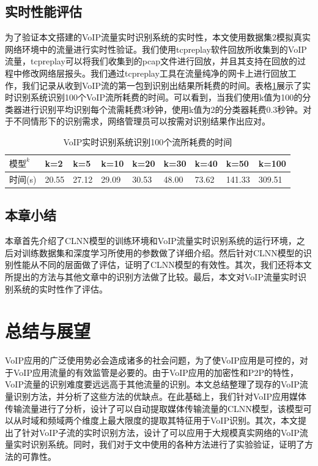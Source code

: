 \section{实时性能评估}
为了验证本文搭建的VoIP流量实时识别系统的实时性，本文使用数据集2模拟真实网络环境中的流量进行实时性验证。我们使用tcpreplay软件回放所收集到的VoIP流量，tcpreplay可以将我们收集到的pcap文件进行回放，并且其支持在回放的过程中修改网络层报头。我们通过tcpreplay工具在流量纯净的网卡上进行回放工作，我们记录从收到VoIP流的第一包到识别出结果所耗费的时间。表格\ref{tab:time4folws}展示了实时识别系统识别100个VoIP流所耗费的时间。可以看到，当我们使用k值为100的分类器进行识别平均识别每个流需耗费3秒钟，使用k值为2的分类器耗费0.3秒钟。对于不同情形下的识别需求，网络管理员可以按需对识别结果作出应对。

\begin{table}
  \caption{VoIP实时识别系统识别100个流所耗费的时间}
  \label{tab:time4folws}
  \centering
  \begin{tabular}{l l l l l l l l l}
    \hline
    \textbf{$\text{模型}^k$} &\textbf{k=2}&\textbf{k=5}&\textbf{k=10}&\textbf{k=20}&\textbf{k=30}&\textbf{k=40}&\textbf{k=50}&\textbf{k=100}\\
    \hline
    时间(s)      &20.55  & 27.12&29.09&30.53&48.00&73.62&141.33&309.51  \\
    \hline
  \end{tabular}
\end{table}

\section{本章小结}
本章首先介绍了CLNN模型的训练环境和VoIP流量实时识别系统的运行环境，之后对训练数据集和深度学习所使用的参数做了详细介绍。然后针对CLNN模型的识别性能从不同的层面做了评估，证明了CLNN模型的有效性。其次，我们还将本文所提出的方法与其他文章中的识别方法做了比较。最后，本文对VoIP流量实时识别系统的实时性作了评估。



\chapter{总结与展望}
VoIP应用的广泛使用势必会造成诸多的社会问题，为了使VoIP应用是可控的，对于VoIP应用流量的有效监管是必要的。由于VoIP应用的加密性和P2P的特性，VoIP流量的识别难度要远远高于其他流量的识别。本文总结整理了现存的VoIP流量识别方法，并分析了这些方法的优缺点。在此基础上，我们针对VoIP应用媒体传输流量进行了分析，设计了可以自动提取媒体传输流量的CLNN模型，该模型可以从时域和频域两个维度上最大限度的提取其特征用于VoIP识别。其次，本文提出了针对VoIP子流的实时识别方法，设计了可以应用于大规模真实网络的VoIP流量实时识别系统。同时，我们对于文中使用的各种方法进行了实验验证，证明了方法的可靠性。

